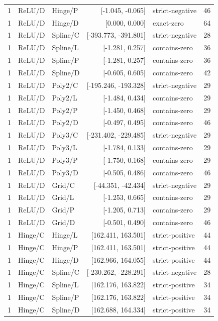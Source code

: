 \begin{longtable}{lllrlr}
1 & ReLU/D & Hinge/P & [-1.045, -0.065] & strict-negative & 46 \\
1 & ReLU/D & Hinge/D & [0.000, 0.000] & exact-zero & 64 \\
1 & ReLU/D & Spline/C & [-393.773, -391.801] & strict-negative & 28 \\
1 & ReLU/D & Spline/L & [-1.281, 0.257] & contains-zero & 36 \\
1 & ReLU/D & Spline/P & [-1.281, 0.257] & contains-zero & 36 \\
1 & ReLU/D & Spline/D & [-0.605, 0.605] & contains-zero & 42 \\
1 & ReLU/D & Poly2/C & [-195.246, -193.328] & strict-negative & 29 \\
1 & ReLU/D & Poly2/L & [-1.484, 0.434] & contains-zero & 29 \\
1 & ReLU/D & Poly2/P & [-1.450, 0.468] & contains-zero & 29 \\
1 & ReLU/D & Poly2/D & [-0.497, 0.495] & contains-zero & 46 \\
1 & ReLU/D & Poly3/C & [-231.402, -229.485] & strict-negative & 29 \\
1 & ReLU/D & Poly3/L & [-1.784, 0.133] & contains-zero & 29 \\
1 & ReLU/D & Poly3/P & [-1.750, 0.168] & contains-zero & 29 \\
1 & ReLU/D & Poly3/D & [-0.505, 0.486] & contains-zero & 46 \\
1 & ReLU/D & Grid/C & [-44.351, -42.434] & strict-negative & 29 \\
1 & ReLU/D & Grid/L & [-1.253, 0.665] & contains-zero & 29 \\
1 & ReLU/D & Grid/P & [-1.205, 0.713] & contains-zero & 29 \\
1 & ReLU/D & Grid/D & [-0.501, 0.490] & contains-zero & 46 \\
1 & Hinge/C & Hinge/L & [162.411, 163.501] & strict-positive & 44 \\
1 & Hinge/C & Hinge/P & [162.411, 163.501] & strict-positive & 44 \\
1 & Hinge/C & Hinge/D & [162.966, 164.055] & strict-positive & 44 \\
1 & Hinge/C & Spline/C & [-230.262, -228.291] & strict-negative & 28 \\
1 & Hinge/C & Spline/L & [162.176, 163.822] & strict-positive & 34 \\
1 & Hinge/C & Spline/P & [162.176, 163.822] & strict-positive & 34 \\
1 & Hinge/C & Spline/D & [162.688, 164.334] & strict-positive & 34 \\

\end{longtable}
